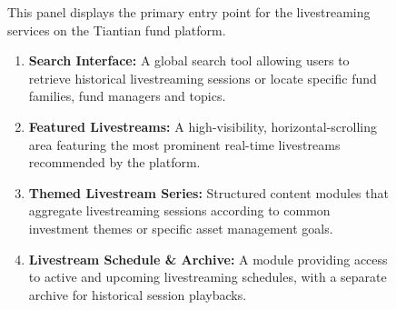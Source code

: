 \begin{landscape}
\begin{figure}[p]
    \begin{minipage}[b][\appheight][c]{0.50\textwidth}
        \begin{tcolorbox}[height=\appheight, colback=red!5!white, colframe=red!75!black, 
            title=Platform Portal Interface, valign=center, arc=0pt, outer arc=0pt, boxrule=1.5pt]
            \small
            This panel displays the primary entry point for the livestreaming services on the Tiantian fund platform. 
            \begin{enumerate}[label=\textbf{(\arabic*)}, leftmargin=*, itemsep=4pt]
                \item \textbf{Search Interface:} A global search tool allowing users to retrieve historical livestreaming sessions or locate specific fund families, fund managers and topics.
                \item \textbf{Featured Livestreams:} A high-visibility, horizontal-scrolling area featuring the most prominent real-time livestreams recommended by the platform.
                \item \textbf{Themed Livestream Series:} Structured content modules that aggregate livestreaming sessions according to common investment themes or specific asset management goals.
                \item \textbf{Livestream Schedule \& Archive:} A module providing access to active and upcoming livestreaming schedules, with a separate archive for historical session playbacks.
            \end{enumerate}
        \end{tcolorbox}
    \end{minipage}

    \vspace{10pt}
\end{figure}
\end{landscape}

\newpage

